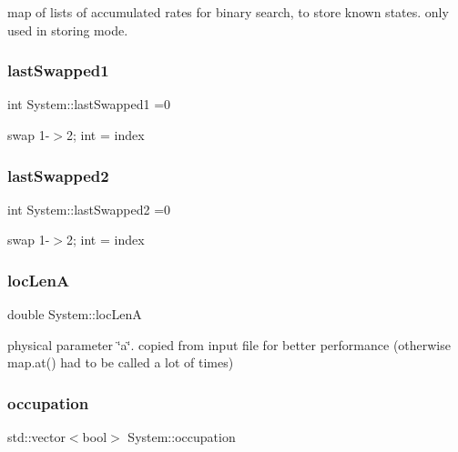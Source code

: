 map of lists of accumulated rates for binary search, to store known states. only used in storing mode. \mbox{\label{classSystem_a6cae5a9a0157f7e6042bda0807879568}} 
\subsubsection{\texorpdfstring{last\+Swapped1}{lastSwapped1}}
{\footnotesize\ttfamily int System\+::last\+Swapped1 =0\hspace{0.3cm}{\ttfamily [private]}}

swap 1-\/$>$2; int = index \mbox{\label{classSystem_a6ddf57bedba9389eb75ffb60cad1391c}} 
\subsubsection{\texorpdfstring{last\+Swapped2}{lastSwapped2}}
{\footnotesize\ttfamily int System\+::last\+Swapped2 =0\hspace{0.3cm}{\ttfamily [private]}}

swap 1-\/$>$2; int = index \mbox{\label{classSystem_a292939d005702b34cb3d40d169b24639}} 
\subsubsection{\texorpdfstring{loc\+LenA}{locLenA}}
{\footnotesize\ttfamily double System\+::loc\+LenA\hspace{0.3cm}{\ttfamily [private]}}

physical parameter \char`\"{}a\char`\"{}. copied from input file for better performance (otherwise map.\+at() had to be called a lot of times) \mbox{\label{classSystem_af13aaae75d6cff51d202b004a9fdc3d4}} 
\subsubsection{\texorpdfstring{occupation}{occupation}}
{\footnotesize\ttfamily std\+::vector$<$bool$>$ System\+::occupation\hspace{0.3cm}{\ttfamily [private]}}

